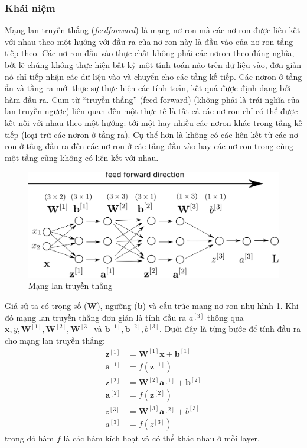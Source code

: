 \subsubsection{Khái niệm}
Mạng lan truyền thẳng (\textit{feedforward}) \cite{cs231n} là mạng nơ-ron mà các nơ-ron được liên kết với nhau theo một hướng với đầu ra của nơ-ron này là đầu vào của nơ-ron tầng tiếp theo. Các nơ-ron đầu vào thực chất không phải các nơron theo đúng nghĩa, bởi lẽ chúng không thực hiện bất kỳ một tính toán nào trên dữ liệu vào, đơn giản nó chỉ tiếp nhận các dữ liệu vào và chuyển cho các tầng kế tiếp. Các nơron ở tầng ẩn và tầng ra mới thực sự thực hiện các tính toán, kết quả được định dạng bởi hàm đầu ra. Cụm từ “truyền thẳng” (feed forward) (không phải là trái nghĩa của lan truyền ngược) liên quan đến một thực tế là tất cả các nơ-ron chỉ có thể được kết nối với nhau theo một hướng: tới một hay nhiều các nơron khác trong tầng kế tiếp (loại trừ các nơron ở tầng ra). Cụ thể hơn là không có các liên kết từ các nơ-ron ở tầng đầu ra đến các nơ-ron ở các tầng đầu vào hay các nơ-ron trong cùng một tầng cũng không có liên kết với nhau.

\begin{center}
 	\begin{figure}[H]
    \begin{center}
     \includegraphics[scale=0.5]{chap3/image/feedforwarddircetion.png}
    \end{center}
    \caption{Mạng lan truyền thẳng}
    \label{fig:feedforwarddirection}
    \end{figure}
\end{center}

Giả sử ta có trọng số ($\textbf{W}$), ngưỡng (\textbf{b}) và cấu trúc mạng nơ-ron như hình \ref{fig:feedforwarddirection}. Khi đó mạng lan truyền thẳng đơn giản là tính đầu ra $a^{[3]}$ thông qua $\mathbf{x}, y, \mathbf{W}^{[1]}, \mathbf{W}^{[2]}, \mathbf{W}^{[3]}$ và $\mathbf{b}^{[1]}, \mathbf{b}^{[2]}, b^{[3]}$. Dưới đây là từng bước để tính đầu ra cho mạng lan truyền thẳng:
\begin{align*}
\mathbf{z}^{[1]} &= \mathbf{W}^{[1]} \mathbf{x} + \mathbf{b}^{[1]} \\
\mathbf{a}^{[1]} &= f(\mathbf{z}^{[1]})\\
\mathbf{z}^{[2]} &= \mathbf{W}^{[2]} \mathbf{a}^{[1]} + \mathbf{b}^{[2]} \\
\mathbf{a}^{[2]} &= f(\mathbf{z}^{[2]})\\
z^{[3]} &= \mathbf{W}^{[3]} \mathbf{a}^{[2]} + b^{[3]}\\
a^{[3]} &= f(z^{[3]})
\end{align*}
trong đó hàm $f$ là các hàm kích hoạt và có thể khác nhau ở mỗi layer.
